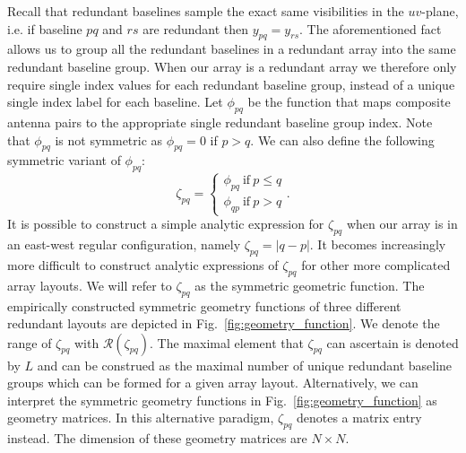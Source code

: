 \documentclass[useAMS,usenatbib]{mn2e}
\begin{document}
Recall that redundant baselines sample the exact same visibilities in the $uv$-plane, i.e. if baseline $pq$ and $rs$ are redundant then $y_{pq} = y_{rs}$. 
The aforementioned fact allows us to group all the redundant baselines in a redundant array into the same redundant baseline group. When our array 
is a redundant array we therefore only require single index values for each redundant baseline group, instead of a unique single index label for 
each baseline. Let $\phi_{pq}$ be the function that maps composite antenna pairs to the appropriate single redundant baseline group index. Note that $\phi_{pq}$ is not symmetric as 
$\phi_{pq} = 0$ if $p>q$. We can also define the following symmetric variant of $\phi_{pq}$:
\begin{equation}
\zeta_{pq} = 
\begin{cases}
\phi_{pq}~\textrm{if}~p \leq q\\
\phi_{qp}~\textrm{if}~p>q
\end{cases}.
\end{equation} 
It is possible to construct a simple analytic expression for $\zeta_{pq}$ when our array is in an east-west regular configuration, namely $\zeta_{pq} = |q-p|$. 
It becomes increasingly more difficult to construct analytic expressions of $\zeta_{pq}$ for other more complicated array layouts. 
We will refer to $\zeta_{pq}$ as the symmetric geometric function. The empirically constructed symmetric geometry
functions of three different redundant layouts are depicted in Fig.~\ref{fig:geometry_function}. We denote the range of $\zeta_{pq}$ with $\mathcal{R}(\zeta_{pq})$. The maximal element 
that $\zeta_{pq}$ can ascertain is denoted by $L$ and can be construed as the maximal number of unique redundant baseline groups which can be formed for a given 
array layout. Alternatively, we can interpret the symmetric geometry functions in Fig.~\ref{fig:geometry_function} as geometry matrices. In this alternative paradigm, $\zeta_{pq}$ denotes a matrix entry instead. The dimension of these geometry 
matrices are $N\times N$. 
\end{document}
